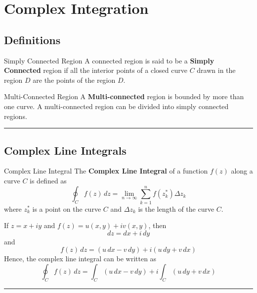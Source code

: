 \section{Complex Integration}
\subsection{Definitions}
\begin{definition}{Simply Connected Region}{}
    A connected region is said to be a \textbf{Simply Connected} region if all the interior points of a closed curve $C$ drawn in the region $D$ are the points of the region $D$.
\end{definition}

\begin{definition}{Multi-Connected Region}{}
    A \textbf{Multi-connected} region is bounded by more than one curve. A multi-connected region can be divided into simply connected regions.
\end{definition}

\vspace{20pt}\rule{3in}{1pt}


\subsection{Complex Line Integrals}
\begin{definition}{Complex Line Integral}{}
    The \textbf{Complex Line Integral} of a function $f(z)$ along a curve $C$ is defined as
    \begin{equation}
        \oint_C f(z) \, dz = \lim_{n \to \infty} \sum_{k=1}^n f(z_k^*) \Delta z_k
    \end{equation}
    where $z_k^*$ is a point on the curve $C$ and $\Delta z_k$ is the length of the curve $C$.
\end{definition}
\vspace{20pt}

If $z = x + iy$ and $f(z) = u(x,y) + iv(x,y)$, then \[
    d{z} = dx + i \, dy
\] and \[
    f(z) \, dz = (u \, dx - v \, dy) + i(u \, dy + v \, dx)
\] Hence, the complex line integral can be written as
\begin{equation}
    \boxed{ \oint_C f(z) \, dz = \int_C (u \, dx - v \, dy) + i \int_C (u \, dy + v \, dx) }
\end{equation}

\vspace{20pt}\rule{3in}{1pt}


